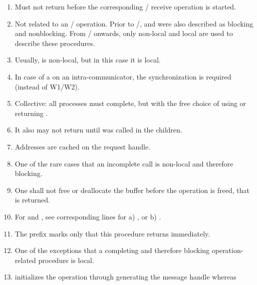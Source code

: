 {\small
\begin{enumerate}
\item \label{semantics:item1} Must not return before the corresponding \MPI/ receive operation is started.
\item \label{semantics:item2} Not related to an \MPI/ operation.
Prior to \MPIIVDOTO/,  and 
were also described as blocking and nonblocking.
From \MPIIVDOTO/ onwards, only non-local and local are used to describe these procedures.
\item \label{semantics:item3} Usually,  is non-local, but in this case it is local.
\item \label{semantics:item4} In case of a  on an intra-communicator,
      the  synchronization is required (instead of W1/W2).
\item \label{semantics:item5} Collective: all processes must complete, but with the free choice of using 
     or  returning .
\item \label{semantics:item6} It also may not return until  was called in the children.
\item \label{semantics:item7} Addresses are cached on the request handle.
\item \label{semantics:item8}
One of the rare cases that an incomplete call is non-local and therefore blocking.
\item \label{semantics:item9} One shall not free or deallocate the buffer before the operation is freed, that is  returned.
\item \label{semantics:item10} For  and , see corresponding lines for a) , or b) .
\item \label{semantics:item11}
The prefix  marks only that this procedure returns immediately.
\item \label{semantics:item12}
One of the exceptions that a completing and therefore blocking operation-related procedure is local.
\item \label{semantics:item13} 
      initializes the operation through generating the message handle
      whereas

\end{enumerate}}
